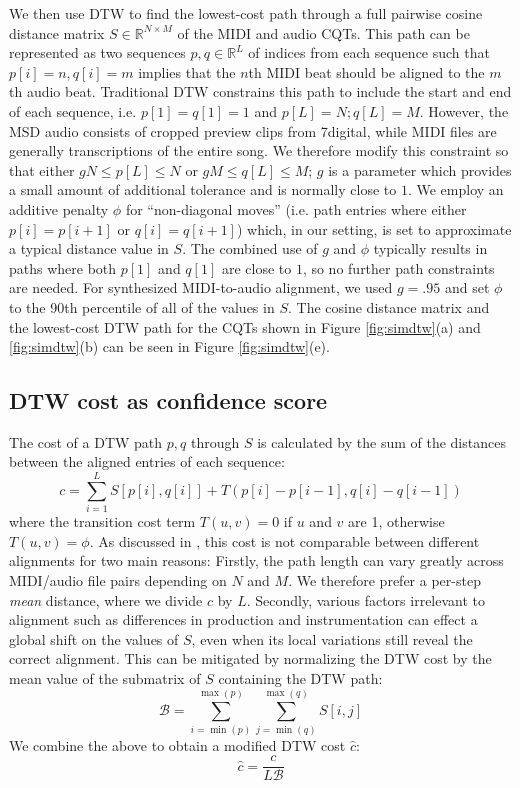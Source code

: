 \documentclass{article}
\begin{document}
We then use DTW to find the lowest-cost path through a full pairwise cosine distance matrix $S \in \mathbb{R}^{N \times M}$ of the MIDI and audio CQTs.
This path can be represented as two sequences $p, q \in \mathbb{R}^L$ of indices from each sequence such that $p[i] = n, q[i] = m$ implies that the $n$th MIDI beat should be aligned to the $m$th audio beat.
Traditional DTW constrains this path to include the start and end of each sequence, i.e. $p[1] = q[1] = 1$ and $p[L] = N; q[L] = M$.
However, the MSD audio consists of cropped preview clips from 7digital, while MIDI files are generally transcriptions of the entire song.
We therefore modify this constraint so that either $gN \le p[L] \le N$ or $gM \le q[L] \le M$; $g$ is a parameter which provides a small amount of additional tolerance and is normally close to $1$.
We employ an additive penalty $\phi$ for ``non-diagonal moves'' (i.e. path entries where either $p[i] = p[i + 1]$ or $q[i] = q[i + 1]$) which, in our setting, is set to approximate a typical distance value in $S$.
The combined use of $g$ and $\phi$ typically results in paths where both $p[1]$ and $q[1]$ are close to $1$, so no further path constraints are needed.
For synthesized MIDI-to-audio alignment, we used $g = .95$ and set $\phi$ to the 90th percentile of all of the values in $S$.
The cosine distance matrix and the lowest-cost DTW path for the CQTs shown in Figure \ref{fig:simdtw}(a) and \ref{fig:simdtw}(b) can be seen in Figure \ref{fig:simdtw}(e).

\subsection{DTW cost as confidence score}
\label{sec:score}

The cost of a DTW path $p, q$ through $S$ is calculated by the sum of the distances between the aligned entries of each sequence:
$$
c = \sum_{i = 1}^L S[p[i], q[i]] + T(p[i] - p[i-1], q[i] - q[i-1])
$$
where the transition cost term $T(u,v) = 0$ if $u$ and $v$ are 1, otherwise $T(u, v) = \phi$.
As discussed in \cite{hu2003polyphonic}, this cost is not comparable between different alignments for two main reasons: Firstly, the path length can vary greatly across MIDI/audio file pairs depending on $N$ and $M$.
We therefore prefer a per-step {\em mean} distance, where we divide $c$ by $L$.
Secondly, various factors irrelevant to alignment such as differences in production and instrumentation can effect a global shift on the values of $S$, even when its local variations still reveal the correct alignment.  
This can be mitigated by normalizing the DTW cost by the mean value of the submatrix of $S$ containing the DTW path:
$$
\mathcal{B} = \sum_{i = \min(p)}^{\max(p)} \sum_{j = \min(q)}^{\max(q)} S[i, j] 
$$
We combine the above to obtain a modified DTW cost $\hat{c}$:
$$
\hat{c} = \frac{c}{L \mathcal{B}}
$$
\end{document}
